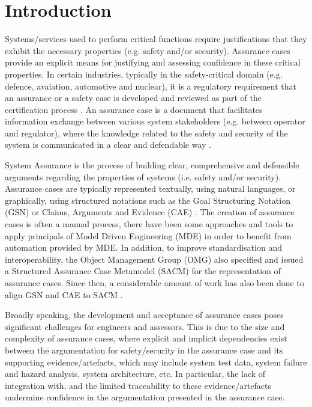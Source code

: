 \section{Introduction}
Systems/services used to perform critical functions require justifications that they exhibit the necessary properties (e.g. safety and/or security). Assurance cases provide an explicit means for justifying and assessing confidence in these critical properties. In certain industries, typically in the safety-critical domain (e.g. defence, avaiation, automotive and nuclear), it is a regulatory requirement that an assurance or a safety case is developed and reviewed as part of the certification process \cite{healthFound}.
An assurance case is a document that facilitates information exchange between various system stakeholders (e.g. between operator and regulator), where the knowledge related to the safety and security of the system is communicated in a clear and defendable way \cite{}. 

System Assurance is the process of building clear, comprehensive and defensible arguments regarding the properties of systems (i.e. safety and/or security). 
Assurance cases are typically represented textually, using natural languages, or graphically, using structured notations such as the Goal Structuring Notation (GSN) \cite{} or Claims, Arguments and Evidence (CAE) \cite{}. 
The creation of assurance cases is often a manual process, there have been some approaches and tools to apply principals of Model Driven Engineering (MDE) in order to benefit from automation provided by MDE. 
In addition, to improve standardisation and interoperability, the Object Management Group (OMG) also specified and issued a Structured Assurance Case Metamodel (SACM) for the representation of assurance cases. 
Since then, a considerable amount of work has also been done to align GSN and CAE to SACM \cite{}. 

Broadly speaking, the development and acceptance of assurance cases poses significant challenges for engineers and assessors. This is due to the size and complexity of assurance cases, where explicit and implicit dependencies exist between the argumentation for safety/security in the assurance case and its supporting evidence/artefacts, which may include system test data, system failure and hazard analysis, system architecture, etc. In particular, the lack of integration with, and the limited traceability to these evidence/artefacts undermine confidence in the argumentation presented in the assurance case. 

